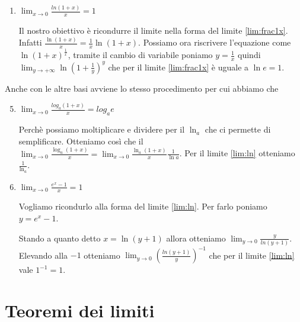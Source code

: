 \begin{enumerate}[label=\textbf{\arabic*})]
\begin{dimostration}
    Dato $x\geq 1$, $\exists !n\in\mathbb{N}$ t.c. $x\leq x\leq n+1$, ovvero x è compreso tra due numeri naturali, dico che:
    \begin{equation*}
        (1+\frac{1}{n+1})^n \leq (1+\frac{1}{x})^x \leq (1+\frac{1}{n})^{n+1}
    \end{equation*}
    Con qualche manipolazione algebrica otteniamo:
    \begin{equation*}
        \frac{a_n+1}{1+\frac{1}{n+1}}\leq (1+\frac{1}{x})^x\leq a_n(1+\frac{1}{n})
    \end{equation*}
    Dove $a_n$ tende ad $e$. Per il teorema dei carabinieri anche il $\lim_{x\to+\infty}(1+\frac{1}{x})^x=e$.
    \end{dimostration}
    
    \item \label{lim:ln}$\lim_{x\to 0} \frac{ln(1+x)}{x}=1$
    
    Il nostro obiettivo è ricondurre il limite nella forma del limite \ref{lim:frac1x}.
    Infatti $\frac{\ln(1+x)}{x}=\frac{1}{x}\ln(1+x)$. Possiamo ora riscrivere l'equazione come $\ln(1+x)^{\frac{1}{x}}$, tramite il cambio di variabile poniamo $y=\frac{1}{x}$ quindi $\lim_{y\to+\infty}\ln(1+\frac{1}{y})^{y}$ che per il limite \ref{lim:frac1x} è uguale a $\ln e=1$.
\end{enumerate}
Anche con le altre basi avviene lo stesso procedimento per cui abbiamo che
\begin{enumerate}[label=\textbf{\arabic*})]\setcounter{enumi}{4}
    \item \label{lim:log} $\lim_{x\to 0} \frac{log_{a}(1+x)}{x}=log_{a}e$
    
    Perchè possiamo moltiplicare e dividere per il $\ln_a$ che ci permette di semplificare. Otteniamo così che il $\lim_{x\to 0} \frac{\log_{a}(1+x)}{x}=\lim_{x\to 0}\frac{\ln_a(1+x)}{x}\frac{1}{\ln a}$. Per il limite \ref{lim:ln} otteniamo $\frac{1}{\ln_a}$.
    
    \item $\lim_{x\to 0}\frac{e^{x}-1}{x}=1$
    
    Vogliamo ricondurlo alla forma del limite \ref{lim:ln}. Per farlo poniamo $y=e^{x}-1$.
    
    Stando a quanto detto $x=\ln(y+1)$ allora otteniamo $\lim_{y\to 0}\frac{y}{ln(y+1)}$. Elevando alla $-1$ otteniamo $\lim_{y\to 0}(\frac{ln(y+1)}{y})^{-1}$ che per il limite \ref{lim:ln} vale $1^{-1}=1$.
\end{enumerate}


\section{Teoremi dei limiti}
